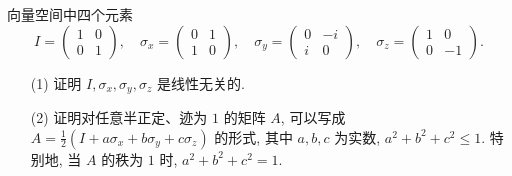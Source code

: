 \documentclass{assignment}
\begin{document}
\begin{prob}
    向量空间中四个元素
    \[
        I=\begin{pmatrix}
            1&0\\
            0&1
        \end{pmatrix},\quad\sigma_x=\begin{pmatrix}
            0&1\\
            1&0
        \end{pmatrix},\quad\sigma_y=\begin{pmatrix}
            0&-i\\
            i&0
        \end{pmatrix},\quad\sigma_z=\begin{pmatrix}
            1&0\\
            0&-1
        \end{pmatrix}.
    \]
    \begin{itemize}
        \item[(1)] 证明 $I,\sigma_x,\sigma_y,\sigma_z$ 是线性无关的.
        \item[(2)] 证明对任意半正定、迹为 $1$ 的矩阵 $A$, 可以写成 $A=\frac{1}{2}(I+a\sigma_x+b\sigma_y+c\sigma_z)$ 的形式, 其中 $a,b,c$ 为实数, $a^2+b^2+c^2\leq 1$. 特别地, 当 $A$ 的秩为 $1$ 时, $a^2+b^2+c^2=1$.
    \end{itemize}
\end{prob}
\end{document}
